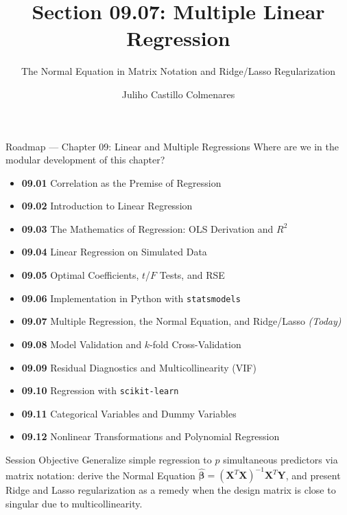 \documentclass[10pt, aspectratio=169]{beamer}
\title[Multiple Regression]{Section 09.07: Multiple Linear Regression}
\subtitle{The Normal Equation in Matrix Notation and Ridge/Lasso Regularization}
\author[J. Castillo Colmenares]{Juliho Castillo Colmenares}
\institute{Tecnológico de Monterrey}
\date{\vspace{-1.5cm}}
\begin{document}
\begin{frame}[plain]
  \titlepage
\end{frame}

\begin{frame}{Roadmap --- Chapter 09: Linear and Multiple Regressions}
  \scriptsize
  Where are we in the modular development of this chapter?
  \begin{itemize}\itemsep=0.02em
    \item \textbf{09.01} Correlation as the Premise of Regression
    \item \textbf{09.02} Introduction to Linear Regression
    \item \textbf{09.03} The Mathematics of Regression: OLS Derivation and $R^2$
    \item \textbf{09.04} Linear Regression on Simulated Data
    \item \textbf{09.05} Optimal Coefficients, $t$/$F$ Tests, and RSE
    \item \textbf{09.06} Implementation in Python with \texttt{statsmodels}
    \item \textbf{09.07} Multiple Regression, the Normal Equation, and Ridge/Lasso \emph{(Today)}
    \item \textbf{09.08} Model Validation and $k$-fold Cross-Validation
    \item \textbf{09.09} Residual Diagnostics and Multicollinearity (VIF)
    \item \textbf{09.10} Regression with \texttt{scikit-learn}
    \item \textbf{09.11} Categorical Variables and Dummy Variables
    \item \textbf{09.12} Nonlinear Transformations and Polynomial Regression
  \end{itemize}
  \pause
  \vspace{-0.05cm}
  \begin{block}{Session Objective}
    Generalize simple regression to $p$ simultaneous predictors via matrix notation: derive the Normal Equation $\hat{\boldsymbol\beta}=(\mathbf{X}^T\mathbf{X})^{-1}\mathbf{X}^T\mathbf{Y}$, and present Ridge and Lasso regularization as a remedy when the design matrix is close to singular due to multicollinearity.
  \end{block}
\end{frame}
\end{document}
